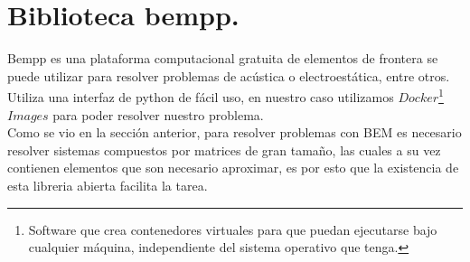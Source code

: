 \chapter{Biblioteca bempp.}\label{sec:Biblioteca bempp.}
\setcounter{figure}{0}
\setcounter{equation}{0}
Bempp es una plataforma computacional gratuita de elementos de frontera se puede utilizar para resolver problemas de acústica o electroestática, entre otros. Utiliza una interfaz de python de fácil uso, en nuestro caso utilizamos $Docker$\footnote{Software que crea contenedores virtuales para que puedan ejecutarse bajo cualquier máquina, independiente del sistema operativo que tenga.} $Images$ para poder resolver nuestro problema.\\ 
Como se vio en la sección anterior, para resolver problemas con BEM es necesario resolver sistemas compuestos por matrices de gran tamaño, las cuales a su vez contienen elementos que son necesario aproximar, es por esto que la existencia de esta libreria abierta facilita la tarea.

